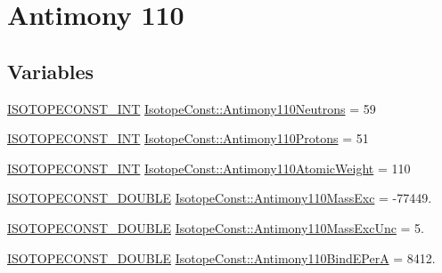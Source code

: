\hypertarget{group___isotope_const-_antimony-_sb110}{}\section{Antimony 110}
\label{group___isotope_const-_antimony-_sb110}
\subsection*{Variables}
\begin{DoxyCompactItemize}
\item 
\mbox{\hyperlink{group___isotope_const-_macros_ga5f18360b3e99483a35c32d789e62621c}{I\+S\+O\+T\+O\+P\+E\+C\+O\+N\+S\+T\+\_\+\+I\+NT}} \mbox{\hyperlink{group___isotope_const-_antimony-_sb110_ga78a04a3a82d7aa2d7e327424e53199b4}{Isotope\+Const\+::\+Antimony110\+Neutrons}} = 59
\item 
\mbox{\hyperlink{group___isotope_const-_macros_ga5f18360b3e99483a35c32d789e62621c}{I\+S\+O\+T\+O\+P\+E\+C\+O\+N\+S\+T\+\_\+\+I\+NT}} \mbox{\hyperlink{group___isotope_const-_antimony-_sb110_ga7224fdf4de031ebc3e30d3aebb9e45eb}{Isotope\+Const\+::\+Antimony110\+Protons}} = 51
\item 
\mbox{\hyperlink{group___isotope_const-_macros_ga5f18360b3e99483a35c32d789e62621c}{I\+S\+O\+T\+O\+P\+E\+C\+O\+N\+S\+T\+\_\+\+I\+NT}} \mbox{\hyperlink{group___isotope_const-_antimony-_sb110_gadd1f49eff1ec4e7823e9add6cf24140e}{Isotope\+Const\+::\+Antimony110\+Atomic\+Weight}} = 110
\item 
\mbox{\hyperlink{group___isotope_const-_macros_ga8f45a7272ce02c0b4c65c44636ed719a}{I\+S\+O\+T\+O\+P\+E\+C\+O\+N\+S\+T\+\_\+\+D\+O\+U\+B\+LE}} \mbox{\hyperlink{group___isotope_const-_antimony-_sb110_ga21d2a42edaeb7d4419ff25929f4b0e2a}{Isotope\+Const\+::\+Antimony110\+Mass\+Exc}} = -\/77449.
\item 
\mbox{\hyperlink{group___isotope_const-_macros_ga8f45a7272ce02c0b4c65c44636ed719a}{I\+S\+O\+T\+O\+P\+E\+C\+O\+N\+S\+T\+\_\+\+D\+O\+U\+B\+LE}} \mbox{\hyperlink{group___isotope_const-_antimony-_sb110_ga47098f95938289aa69aa218a43379802}{Isotope\+Const\+::\+Antimony110\+Mass\+Exc\+Unc}} = 5.
\item 
\mbox{\hyperlink{group___isotope_const-_macros_ga8f45a7272ce02c0b4c65c44636ed719a}{I\+S\+O\+T\+O\+P\+E\+C\+O\+N\+S\+T\+\_\+\+D\+O\+U\+B\+LE}} \mbox{\hyperlink{group___isotope_const-_antimony-_sb110_ga42b353aeb78a99c641ff2d48607fce42}{Isotope\+Const\+::\+Antimony110\+Bind\+E\+PerA}} = 8412.
\item 

\end{DoxyCompactItemize}
